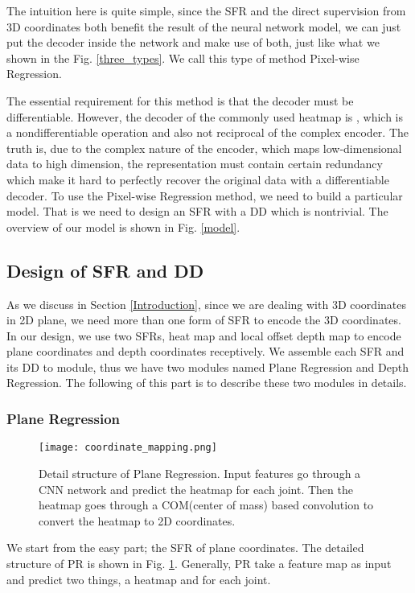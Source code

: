 \documentclass[journal]{IEEEtran}
\begin{document}
The intuition here is quite simple, 
since the SFR and the direct supervision from 3D coordinates both benefit the result of the neural network model, 
we can just put the decoder inside the network and make use of both, just like what we shown in the Fig\@. \ref{three_types}. 
We call this type of method Pixel-wise Regression.

The essential requirement for this method is that the decoder  must be differentiable. 
However, the decoder of the commonly used heatmap is , 
which is a nondifferentiable operation and also not reciprocal of the complex encoder. 
The truth is, due to the complex nature of the encoder, which maps low-dimensional data to high dimension, 
the representation must contain certain redundancy which make it hard to perfectly recover the original data with a differentiable decoder. 
To use the Pixel-wise Regression method, we need to build a particular model. 
That is we need to design an SFR with a DD which is nontrivial. 
The overview of our model is shown in Fig\@. \ref{model}. 

\subsection{Design of SFR and DD}

As we discuss in Section \ref{Introduction}, since we are dealing with 3D coordinates in 2D plane, 
we need more than one form of SFR to encode the 3D coordinates. 
In our design, we use two SFRs, heat map and local offset depth map to encode plane coordinates and depth coordinates receptively. 
We assemble each SFR and its DD to module, thus we have two modules named Plane Regression and Depth Regression. 
The following of this part is to describe these two modules in details. 

\subsubsection{Plane Regression}

\begin{figure}[!t]
  \centering
  \texttt{[image: coordinate\_mapping.png]}
  \caption{Detail structure of Plane Regression. 
  Input features go through a CNN network and predict the heatmap for each joint. 
  Then the heatmap goes through a COM(center of mass) based convolution to convert the heatmap to 2D coordinates.
  }
  \label{PR}
\end{figure}

We start from the easy part; the SFR of plane coordinates. 
The detailed structure of PR is shown in Fig\@. \ref{PR}. 
Generally, PR take a feature map  as input and predict two things, 
a heatmap  and  for each joint. 
\end{document}
